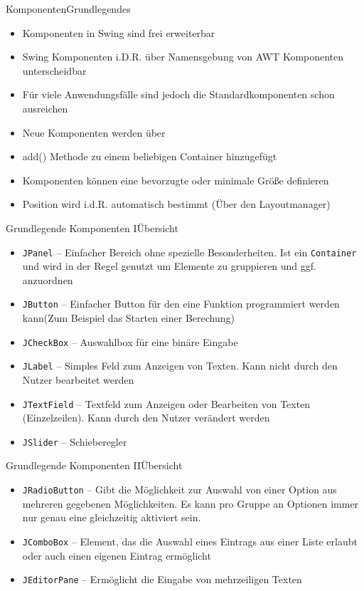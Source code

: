 \begin{frame}{Komponenten}{Grundlegendes}
    \begin{itemize}
        \item Komponenten in Swing sind frei erweiterbar
        \item Swing Komponenten i.D.R. über Namensgebung von AWT Komponenten unterscheidbar
        \item Für viele Anwendungsfälle sind jedoch die Standardkomponenten schon ausreichen
        \item Neue Komponenten werden über \item{add()} Methode zu einem beliebigen Container hinzugefügt
        \item Komponenten können eine bevorzugte oder minimale Größe definieren
        \item Position wird i.d.R. automatisch bestimmt (Über den Layoutmanager)
    \end{itemize}
\end{frame}

\begin{frame}{Grundlegende Komponenten I}{Übersicht}
    \begin{itemize}[<+->]
        \item \texttt{JPanel} -- Einfacher Bereich ohne spezielle Besonderheiten. Ist ein \texttt{Container} und wird in der Regel genutzt um Elemente zu gruppieren und ggf. anzuordnen
        \item \texttt{JButton} -- Einfacher Button für den eine Funktion programmiert werden kann(Zum Beispiel das Starten einer Berechung)
        \item \texttt{JCheckBox} -- Auswahlbox für eine binäre Eingabe
        \item \texttt{JLabel} -- Simples Feld zum Anzeigen von Texten. Kann nicht durch den Nutzer bearbeitet werden
        \item \texttt{JTextField} -- Textfeld zum Anzeigen oder Bearbeiten von Texten (Einzelzeilen). Kann durch den Nutzer verändert werden
        \item \texttt{JSlider} -- Schieberegler
    \end{itemize}
\end{frame}

\begin{frame}{Grundlegende Komponenten II}{Übersicht}
	\begin{itemize}[<+->]
		        \item \texttt{JRadioButton} -- Gibt die Möglichkeit zur Auswahl von einer Option aus mehreren gegebenen Möglichkeiten. Es kann pro Gruppe an Optionen immer nur genau eine gleichzeitig aktiviert sein.
        \item \texttt{JComboBox} -- Element, das die Auswahl eines Eintrags aus einer Liste erlaubt oder auch einen eigenen Eintrag ermöglicht
        \item \texttt{JEditorPane} -- Ermöglicht die Eingabe von mehrzeiligen Texten
	\end{itemize}
\end{frame}

